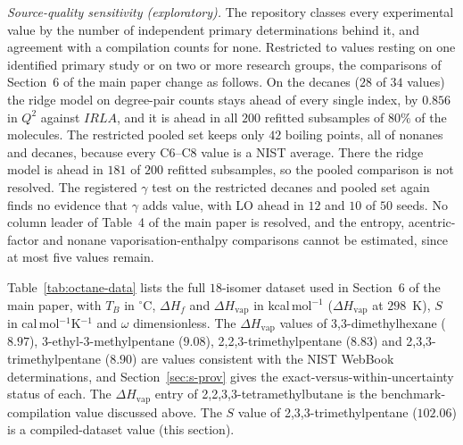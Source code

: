 \documentclass[a5paper, 10pt]{article}
\theoremstyle{plain}
\theoremstyle{remark}
\theoremstyle{definition}
\begin{document}
\emph{Source-quality sensitivity (exploratory).} The repository classes every experimental value by
the number of independent primary determinations behind it, and agreement with a compilation counts
for none. Restricted to values resting on one identified primary study or on two or more research
groups, the comparisons of Section~6 of the main paper change as follows. On the decanes ($28$ of $34$
values) the ridge model on degree-pair counts stays ahead of every single index, by $0.856$ in $Q^2$
against $IRLA$, and it is ahead in all $200$ refitted subsamples of $80\%$ of the molecules. The
restricted pooled set keeps only $42$ boiling points, all of nonanes and decanes, because every C6--C8
value is a NIST average. There the ridge model is ahead in $181$ of $200$ refitted subsamples, so the
pooled comparison is not resolved. The registered $\gamma$ test on the restricted decanes and pooled
set again finds no evidence that $\gamma$ adds value, with LO ahead in $12$ and $10$ of $50$ seeds. No
column leader of Table~4 of the main paper is resolved, and the entropy, acentric-factor and nonane
vaporisation-enthalpy comparisons cannot be estimated, since at most five values remain.



Table~\ref{tab:octane-data} lists the full $18$-isomer dataset used
in Section~6 of the main paper, with $T_B$ in $^{\circ}$C, $\Delta H_f$ and
$\Delta H_{\mathrm{vap}}$ in kcal\,mol$^{-1}$
($\Delta H_{\mathrm{vap}}$ at $298$~K), $S$ in
cal\,mol$^{-1}$K$^{-1}$ and $\omega$ dimensionless. The
$\Delta H_{\mathrm{vap}}$ values of 3,3-dimethylhexane ($8.97$),
3-ethyl-3-methylpentane ($9.08$), 2,2,3-trimethylpentane ($8.83$) and
2,3,3-trimethylpentane ($8.90$) are values consistent with the NIST
WebBook determinations, and Section~\ref{sec:s-prov} gives the
exact-versus-within-uncertainty status of each. The
$\Delta H_{\mathrm{vap}}$ entry of 2,2,3,3-tetramethylbutane is the
benchmark-compilation value discussed above. The $S$ value of
2,3,3-trimethylpentane ($102.06$) is a compiled-dataset value
(this section).
\end{document}
